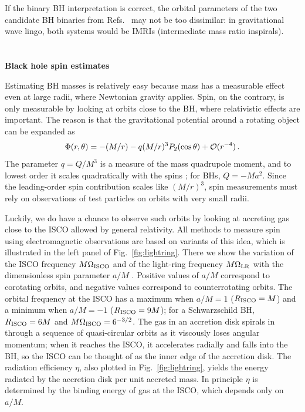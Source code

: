 \documentclass[]{iopart}
\def\be{\begin{equation}}
\def\ee{\end{equation}}
\begin{document}
If the binary BH interpretation is correct, the orbital parameters of the two
candidate BH binaries from Refs.~\cite{Valtonen:2008tx,Boroson:2009va} may not
be too dissimilar: in gravitational wave lingo, both systems would be IMRIs
(intermediate mass ratio inspirals).

\section{\label{app:spins}}
{\bf Black hole spin estimates}
\vskip 2mm

\noindent
Estimating BH masses is relatively easy because mass has a measurable effect
even at large radii, where Newtonian gravity applies. Spin, on the contrary,
is only measurable by looking at orbits close to the BH, where relativistic
effects are important. The reason is that the gravitational potential around a
rotating object can be expanded as
%
\be
\Phi(r,\theta)=
-(M/r)
-q (M/r)^3
P_2(\cos\theta)
+{\cal O}(r^{-4})\,.
\ee
%
The parameter $q=Q/M^3$ is a measure of the mass quadrupole moment, and to
lowest order it scales quadratically with the spins
\cite{Laarakkers:1997hb,Berti:2003nb}; for BHs, $Q=-Ma^2$.  Since the
leading-order spin contribution scales like $(M/r)^3$, spin measurements must
rely on observations of test particles on orbits with very small
radii. 

Luckily, we do have a chance to observe such orbits by looking at accreting
gas close to the ISCO allowed by general relativity.  All methods to measure
spin using electromagnetic observations are based on variants of this
idea, which is illustrated in the left panel of Fig.~\ref{fig:lightring}.
There we show the variation of the ISCO frequency $M\Omega_{\rm ISCO}$ and of
the light-ring frequency $M\Omega_{\rm LR}$ with the dimensionless spin
parameter $a/M$ \cite{Bardeen:1972fi}. Positive values of $a/M$ correspond to
corotating orbits, and negative values correspond to counterrotating
orbits. The orbital frequency at the ISCO has a maximum when $a/M=1$ ($R_{\rm
  ISCO}=M$) and a minimum when $a/M=-1$ ($R_{\rm ISCO}=9M$); for a
Schwarzschild BH, $R_{\rm ISCO}=6M$ and $M\Omega_{\rm ISCO}=6^{-3/2}$. The gas
in an accretion disk spirals in through a sequence of quasi-circular orbits as
it viscously loses angular momentum; when it reaches the ISCO, it accelerates
radially and falls into the BH, so the ISCO can be thought of as the inner
edge of the accretion disk. The radiation efficiency $\eta$, also plotted in
Fig.~\ref{fig:lightring}, yields the energy radiated by the accretion disk per
unit accreted mass. In principle $\eta$ is determined by the binding energy of
gas at the ISCO, which depends only on $a/M$.
\end{document}
